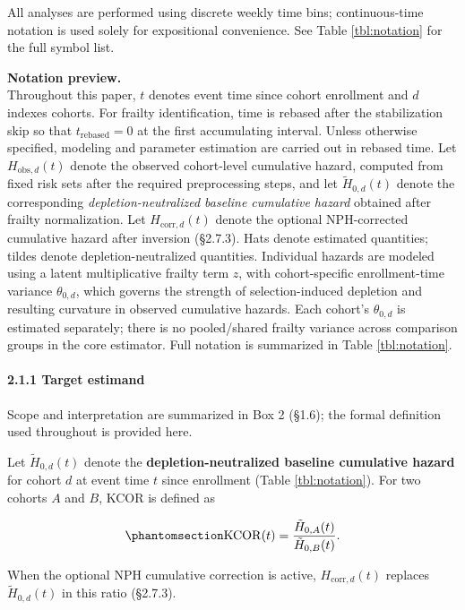 \documentclass[
]{article}
\begin{document}
All analyses are performed using discrete weekly time bins;
continuous-time notation is used solely for expositional convenience.
See Table \ref{tbl:notation} for the full symbol list.

\textbf{Notation preview.}\\
Throughout this paper, \(t\) denotes event time since cohort enrollment
and \(d\) indexes cohorts. For frailty identification, time is rebased
after the stabilization skip so that \(t_{\mathrm{rebased}}=0\) at the
first accumulating interval. Unless otherwise specified, modeling and
parameter estimation are carried out in rebased time. Let
\(H_{\mathrm{obs},d}(t)\) denote the observed cohort-level cumulative
hazard, computed from fixed risk sets after the required preprocessing
steps, and let \(\tilde H_{0,d}(t)\) denote the corresponding
\emph{depletion-neutralized baseline cumulative hazard} obtained after
frailty normalization. Let \(H_{\mathrm{corr},d}(t)\) denote the
optional NPH-corrected cumulative hazard after inversion (§2.7.3). Hats
denote estimated quantities; tildes denote depletion-neutralized
quantities. Individual hazards are modeled using a latent multiplicative
frailty term \(z\), with cohort-specific enrollment-time variance
\(\theta_{0,d}\), which governs the strength of selection-induced
depletion and resulting curvature in observed cumulative hazards. Each
cohort's \(\theta_{0,d}\) is estimated separately; there is no
pooled/shared frailty variance across comparison groups in the core
estimator. Full notation is summarized in Table \ref{tbl:notation}.

\paragraph{2.1.1 Target estimand}\label{target-estimand}

Scope and interpretation are summarized in Box 2 (§1.6); the formal
definition used throughout is provided here.

Let \(\tilde H_{0,d}(t)\) denote the \textbf{depletion-neutralized
baseline cumulative hazard} for cohort \(d\) at event time \(t\) since
enrollment (Table \ref{tbl:notation}). For two cohorts \(A\) and \(B\),
KCOR is defined as

\begin{equation}\protect\phantomsection\label{eq:kcor-estimand}{
\mathrm{KCOR}(t) = \frac{\tilde H_{0,A}(t)}{\tilde H_{0,B}(t)}.
}\end{equation}

When the optional NPH cumulative correction is active,
\(H_{\mathrm{corr},d}(t)\) replaces \(\tilde H_{0,d}(t)\) in this ratio
(§2.7.3).
\end{document}
